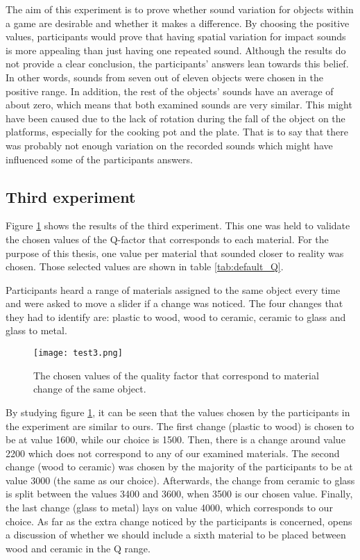 The aim of this experiment is to prove whether sound variation for objects within a game are desirable and whether it makes a difference. By choosing the positive values, participants would prove that having spatial variation for impact sounds is more appealing than just having one repeated sound. Although the results do not provide a clear conclusion, the participants' answers lean towards this belief. In other words, sounds from seven out of eleven objects were chosen in the positive range. In addition, the rest of the objects' sounds have an average of about zero, which means that both examined sounds are very similar. This might have been caused due to the lack of rotation during the fall of the object on the platforms, especially for the cooking pot and the plate. That is to say that there was probably not enough variation on the recorded sounds which might have influenced some of the participants answers.

\subsection{Third experiment}

Figure \ref{fig:test3} shows the results of the third experiment. This one was held to validate the chosen values of the Q-factor that corresponds to each material. For the purpose of this thesis, one value per material that sounded closer to reality was chosen. Those selected values are shown in table \ref{tab:default_Q}.  

Participants heard a range of materials assigned to the same object every time and were asked to move a slider if a change was noticed. The four changes that they had to identify are: plastic to wood, wood to ceramic, ceramic to glass and glass to metal.

\begin{figure}[H]
  \centering
    \texttt{[image: test3.png]}
      \caption{The chosen values of the quality factor that correspond to material change of the same object.}\label{fig:test3}
\end{figure}

By studying figure \ref{fig:test3}, it can be seen that the values chosen by the participants in the experiment are similar to ours. The first change (plastic to wood) is chosen to be at value 1600, while our choice is 1500. Then, there is a change around value 2200 which does not correspond to any of our examined materials. The second change (wood to ceramic) was chosen by the majority of the participants to be at value 3000 (the same as our choice). Afterwards, the change from ceramic to glass is split between the values 3400 and 3600, when 3500 is our chosen value. Finally, the last change (glass to metal) lays on value 4000, which corresponds to our choice. As far as the extra change noticed by the participants is concerned, opens a discussion of whether we should include a sixth material to be placed between wood and ceramic in the \gls{Q} range.

